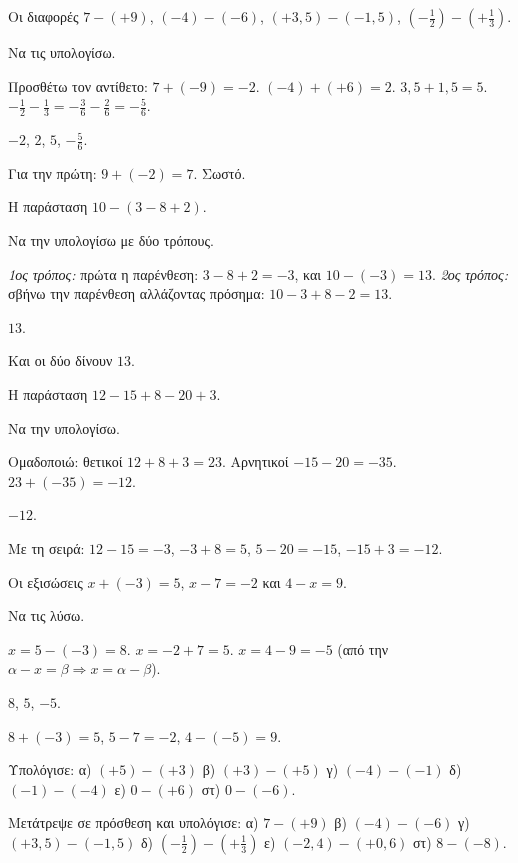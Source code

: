 \tixero Οι διαφορές $7-(+9)$, $(-4)-(-6)$, $(+3{,}5)-(-1{,}5)$, $\left(-\frac{1}{2}\right)-\left(+\frac{1}{3}\right)$.\par
\tithelo Να τις υπολογίσω.\par
\possindeo Προσθέτω τον αντίθετο: $7+(-9)=-2$. $(-4)+(+6)=2$. $3{,}5+1{,}5=5$. $-\frac{1}{2}-\frac{1}{3}=-\frac{3}{6}-\frac{2}{6}=-\frac{5}{6}$.\par
\apantisi $-2$, $2$, $5$, $-\frac{5}{6}$.\par
\elegxos Για την πρώτη: $9+(-2)=7$. Σωστό.

\tixero Η παράσταση $10-(3-8+2)$.\par
\tithelo Να την υπολογίσω με δύο τρόπους.\par
\possindeo \emph{1ος τρόπος:} πρώτα η παρένθεση: $3-8+2=-3$, και $10-(-3)=13$. \emph{2ος τρόπος:} σβήνω την παρένθεση αλλάζοντας πρόσημα: $10-3+8-2=13$.\par
\apantisi $13$.\par
\elegxos Και οι δύο δίνουν $13$.

\tixero Η παράσταση $12-15+8-20+3$.\par
\tithelo Να την υπολογίσω.\par
\possindeo Ομαδοποιώ: θετικοί $12+8+3=23$. Αρνητικοί $-15-20=-35$. $23+(-35)=-12$.\par
\apantisi $-12$.\par
\elegxos Με τη σειρά: $12-15=-3$, $-3+8=5$, $5-20=-15$, $-15+3=-12$.

\tixero Οι εξισώσεις $x+(-3)=5$, $x-7=-2$ και $4-x=9$.\par
\tithelo Να τις λύσω.\par
\possindeo $x=5-(-3)=8$. $x=-2+7=5$. $x=4-9=-5$ (από την $\alpha-x=\beta\Rightarrow x=\alpha-\beta$).\par
\apantisi $8$, $5$, $-5$.\par
\elegxos $8+(-3)=5$, $5-7=-2$, $4-(-5)=9$.



\ex Υπολόγισε: α) $(+5)-(+3)$ \quad β) $(+3)-(+5)$ \quad γ) $(-4)-(-1)$ \quad δ) $(-1)-(-4)$ \quad ε) $0-(+6)$ \quad στ) $0-(-6)$.

\ex Μετάτρεψε σε πρόσθεση και υπολόγισε: α) $7-(+9)$ \quad β) $(-4)-(-6)$ \quad γ) $(+3{,}5)-(-1{,}5)$ \quad δ) $\left(-\frac{1}{2}\right)-\left(+\frac{1}{3}\right)$ \quad ε) $(-2{,}4)-(+0{,}6)$ \quad στ) $8-(-8)$.


